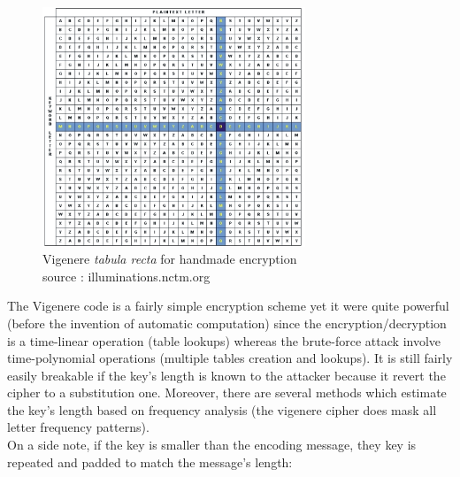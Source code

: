 \begin{figure}[ht!]
    \centering
        \includegraphics[width=0.7\textwidth]{images/vigenere}
	\caption{Vigenere \emph{tabula recta} for handmade encryption\\ source : illuminations.nctm.org}
	\label{fig:TabulaRecta}
\end{figure}

The Vigenere code is a fairly simple encryption scheme yet it were quite powerful (before the invention of automatic computation) since the encryption/decryption is a time-linear operation (table lookups) whereas the brute-force attack involve time-polynomial operations (multiple tables creation and lookups). It is still fairly easily breakable if the key's length is known to the attacker because it revert the cipher to a substitution one. Moreover, there are several methods which estimate the key's length based on frequency analysis (the vigenere cipher does mask all letter frequency patterns).\\





On a side note, if the key is smaller than the encoding message, they key is repeated and padded to match the message's length:

\begin{table}[h!]
    \centering
	\caption{Exemple of an encryption using a padded key.}
	\label{tab:PaddedVignereEncryption}
\end{table}



